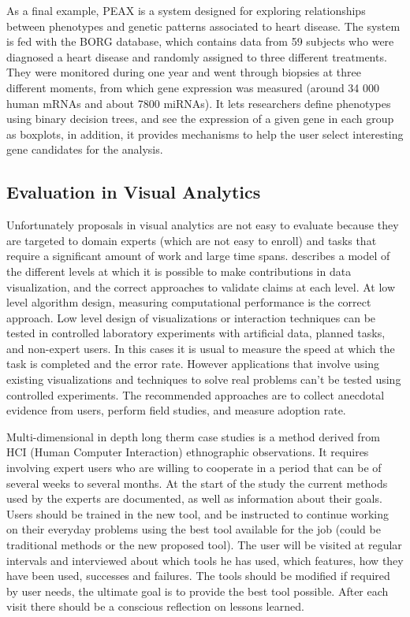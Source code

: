 As a final example, PEAX \autocite{hinterberg_peax:_2014} is a system designed for exploring relationships between phenotypes and genetic patterns associated to heart disease. The system is fed with the BORG database, which contains data from 59 subjects who were diagnosed a heart disease and randomly assigned to three different treatments. They were monitored during one year and went through biopsies at three different moments, from which gene expression was measured (around 34 000 human mRNAs and about 7800 miRNAs). 
It lets researchers define phenotypes using binary decision trees, and see the expression of a given gene in each group as boxplots, in addition, it provides mechanisms to help the user select interesting gene candidates for the analysis.


\subsection{Evaluation in Visual Analytics}

Unfortunately proposals in visual analytics are not easy to evaluate because they are targeted to domain experts (which are not easy to enroll) and tasks that require a significant amount of work and large time spans. \autocite{munzner_nested_2009} describes a model of the different levels at which it is possible to make contributions in data visualization, and the correct approaches to validate claims at each level. At low level algorithm design, measuring computational performance is the correct approach. Low level design of visualizations or interaction techniques can be tested in controlled laboratory experiments with artificial data, planned tasks, and non-expert users. In this cases it is usual to measure the speed at which the task is completed and the error rate. However applications that involve using existing visualizations and techniques to solve real problems can't be tested using controlled experiments. The recommended approaches are to collect anecdotal evidence from users, perform field studies, and measure adoption rate.  
 
Multi-dimensional in depth long therm case studies \autocite{shneiderman_strategies_2006} is a method derived from HCI (Human Computer Interaction) ethnographic observations. It requires involving expert users who are willing to cooperate in a period that can be of several weeks to several months. At the start of the study the current methods used by the experts are documented, as well as information about their goals. Users should be trained in the new tool, and be instructed to continue working on their everyday problems using the best tool available for the job (could be traditional methods or the new proposed tool). The user will be visited at regular intervals and interviewed about which tools he has used, which features, how they have been used, successes and failures. The tools should be modified if required by user needs, the ultimate goal is to provide the best tool possible. After each visit there should be a conscious  reflection on lessons learned.

